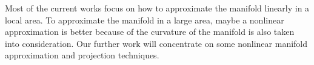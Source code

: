 \documentclass[aos,preprint]{imsart}
\theoremstyle{remark}
\begin{document}
Most of the current works focus on how to approximate the manifold linearly in a local area. To approximate the manifold in a large area, maybe a nonlinear approximation is better because of the curvature of the manifold is also taken into consideration. Our further work will concentrate on some nonlinear manifold approximation and projection techniques.

%
\end{document}
